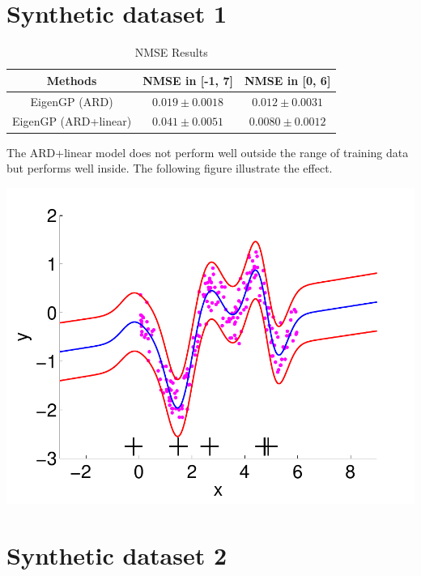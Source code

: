 \documentclass[]{article}
\title{}
\author{}
\begin{document}

\section{Synthetic dataset 1}
\begin{table}[h]
\caption{NMSE Results} \label{table:basisfunction}
\vspace{-.0in}
\begin{center}
\begin{tabular}{|c|c|c|}
\hline
Methods & NMSE in [-1, 7]& NMSE in [0, 6] \\
\hline 
\hline
EigenGP (ARD) &  $ 0.019 \pm 0.0018$ & $0.012\pm0.0031$\\
\hline
EigenGP (ARD+linear)& $0.041\pm0.0051$  & $0.0080\pm0.0012$\\
\hline 
\end{tabular}
\end{center}
\vspace{-.0in}
\end{table}
The ARD+linear model does not perform well outside the range of training data but performs 
well inside. The following figure illustrate the effect.

\includegraphics[scale=0.8]{../syn1/fig/syn_EigenGP_kerB_ns_M5_10.pdf}

\section{Synthetic dataset 2}
\end{document}
